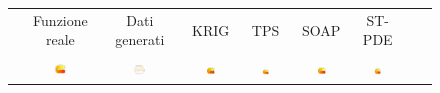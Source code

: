 \documentclass[a4paper,11pt,twoside,openright]{book}							%
\begin{document}
\begin{landscape}
\begin{figure}
\begin{tabular}{lcccccccc}
& Funzione reale & Dati generati & KRIG & TPS & SOAP & ST-PDE \\
&&&&&&\\
\parbox[t]{2mm}{}&\includegraphics[trim=0cm 0cm 0cm 1.8cm,clip=true,width=0.19\textwidth,valign=t]{Immagini/simulazioni/REALEtempo1.png} &
\includegraphics[trim=0.8cm 0.8cm 2.5cm 1.2cm,clip=true,width=0.19\textwidth,valign=t]{immagini/simulazioni/Dati_tempo1.png}&
\includegraphics[trim=0cm 0cm 0cm 1.8cm,clip=true,width=0.19\textwidth,valign=t]{Immagini/simulazioni/KRIGtempo1.png}&
\includegraphics[trim=0cm 0cm 0cm 1.8cm,clip=true,width=0.19\textwidth,valign=t]{Immagini/simulazioni/TPStempo1.png}&
\includegraphics[trim=0cm 0cm 0cm 1.8cm,clip=true,width=0.19\textwidth,valign=t]{Immagini/simulazioni/SOAPtempo1.png}&
\includegraphics[trim=0cm 0cm 0cm 1.8cm,clip=true,width=0.19\textwidth,valign=t]{Immagini/simulazioni/STSRtempo1.png}\\

\end{tabular}
\end{figure}
\end{landscape}
\end{document}
